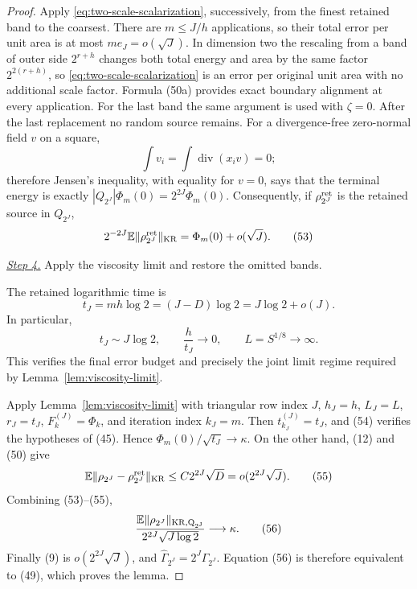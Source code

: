 \documentclass{aomart}
\theoremstyle{definition}
\newcommand{\1}{\mathbf 1}
\begin{document}
\begin{proof}
Apply \eqref{eq:two-scale-scalarization}, successively, from the finest retained band to the coarsest.
There are $m\leq J/h$ applications, so their total error per unit
area is at most $me_ J=o(\sqrt J)$.  In dimension two the rescaling
from a band of outer side $2^{r+h}$ changes both total energy and area
by the same factor $2^{2(r+h)}$, so \eqref{eq:two-scale-scalarization} is an error per original unit
area with no additional scale factor.  Formula (50a) provides exact
boundary alignment at every application.  For the last band the same argument is used
with $\zeta=0$.  After the last replacement no random source remains.
For a divergence-free zero-normal field $v$ on a square,
\begin{equation*}
\int v_ i=\int\operatorname {div}(x_ i v)=0;
\end{equation*}
therefore Jensen's inequality, with equality for $v=0$, says that the
terminal energy is exactly
$|Q_{2^J}|\Phi_m(0)=2^{2J}\Phi_m(0)$.  Consequently, if
$\rho_{2^J}^{\rm ret}$ is the retained source in $Q_ {2^J}$,
\begin{equation}
2^{-2J}\mathbb E\|\rho_{2^J}^{\rm ret}\|_ {\rm KR}
=\Phi_ m(0)+o(\sqrt J).
\tag{53}
\end{equation}

\smallskip\noindent
\underline{\textit{Step 4.}} Apply the viscosity limit and restore the omitted bands.

The retained logarithmic time is
\begin{equation}
t_ J=mh\log2=(J-D)\log2=J\log2+o(J).
\tag{54}
\end{equation}
In particular,
\begin{equation*}
t_J\sim J\log2,\qquad
\frac{h}{t_J}\longrightarrow0,\qquad L=S^{1/8}\longrightarrow\infty.
\end{equation*}
This verifies the final error budget and precisely the joint limit regime
required by Lemma~\ref{lem:viscosity-limit}.

Apply Lemma~\ref{lem:viscosity-limit} with triangular row index $J$,
$h_J=h$, $L_J=L$, $r_J=t_J$, $F_k^{(J)}=\Phi_k$, and iteration index
$k_J=m$.  Then $t_{k_J}^{(J)}=t_J$, and (54) verifies the hypotheses
of (45).  Hence $\Phi_m(0)/\sqrt{t_J}\to\kappa$.  On the other hand,
(12) and (50) give
\begin{equation}
\mathbb E\|\rho_{2^J}-\rho_{2^J}^{\rm ret}\|_ {\rm KR}
\leq C2^{2J}\sqrt D=o(2^{2J}\sqrt J).
\tag{55}
\end{equation}
Combining (53)--(55),
\begin{equation}
\frac{\mathbb E\|\rho_{2^J}\|_ {\rm KR,Q_ {2^J}}}
{2^{2J}\sqrt{J\log2}}\longrightarrow\kappa.
\tag{56}
\end{equation}
Finally (9) is $o(2^{2J}\sqrt J)$, and
$\widehat\Gamma_ {2^J}=2^J\Gamma_ {2^J}$.  Equation (56) is therefore
equivalent to (49), which proves the lemma.

\end{proof}
\end{document}
